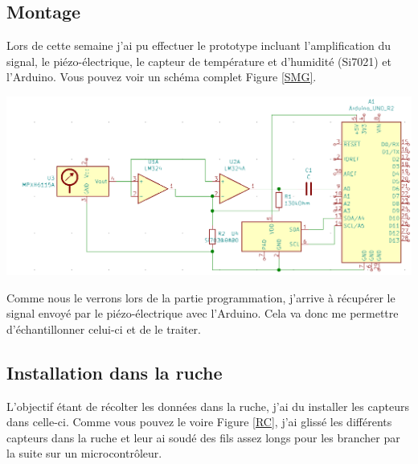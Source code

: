 \documentclass[11pt,french,a4paper]{article}
\begin{document}
\subsection{Montage}
Lors de cette semaine j'ai pu effectuer le prototype incluant l'amplification du signal, le piézo-électrique, le capteur de température et d'humidité (Si7021) et l'Arduino. Vous pouvez voir un schéma complet Figure \ref{SMG}.
\\
\begin{center}
    \includegraphics[scale=0.5]{../img/SMG.png}
    \label{SMG}
\end{center}
Comme nous le verrons lors de la partie programmation, j'arrive à récupérer le signal envoyé par le piézo-électrique avec l'Arduino. Cela va donc me permettre d'échantillonner celui-ci et de le traiter.
\subsection{Installation dans la ruche}
L'objectif étant de récolter les données dans la ruche, j'ai du installer les capteurs dans celle-ci. Comme vous pouvez le voire Figure \ref{RC}, j'ai glissé les différents capteurs dans la ruche et leur ai soudé des fils assez longs pour les brancher par la suite sur un microcontrôleur.
\end{document}
